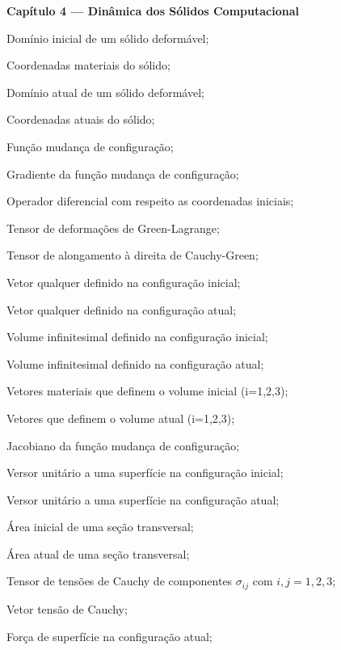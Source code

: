 \begin{simbolos}
  \vspace{0.5cm}
  \item[]\textbf{Capítulo 4 — Dinâmica dos Sólidos Computacional}
  \item[$\Omega_{0}$] Domínio inicial de um sólido deformável;
  \item[$\lPosition$] Coordenadas materiais do sólido;
  \item[$\Omega$] Domínio atual de um sólido deformável;
  \item[$\ePosition$] Coordenadas atuais do sólido;
  \item[$\fmap$] Função mudança de configuração;
  \item[$\gradDeformation$] Gradiente da função mudança de configuração;
  \item[$\lGrad$] Operador diferencial com respeito as coordenadas iniciais;
  \item[$\greenStrain$] Tensor de deformações de Green-Lagrange;
  \item[$\cauchyStretch$] Tensor de alongamento à direita de Cauchy-Green;
  \item[$\mathbf{u}$] Vetor qualquer definido na configuração inicial;
  \item[$\mathbf{v}$] Vetor qualquer definido na configuração atual;
  \item[$dV_{0}$] Volume infinitesimal definido na configuração inicial;
  \item[$dV$] Volume infinitesimal definido na configuração atual;
  \item[$\mathbf{dx}_{i}$] Vetores materiais que definem o volume inicial (i=1,2,3);
  \item[$\mathbf{dy}_{i}$] Vetores que definem o volume atual (i=1,2,3);
  \item[$J$] Jacobiano da função mudança de configuração;
  \item[$\mathbf{N}$] Versor unitário a uma superfície na configuração inicial;
  \item[$\mathbf{n}$] Versor unitário a uma superfície na configuração atual;
  \item[$dA_0$] Área inicial de uma seção transversal;
  \item[$dA$] Área atual de uma seção transversal;
  \item[$\stressTensor$] Tensor de tensões de Cauchy de componentes $\sigma_{ij}$ com $i,j = 1,2,3$;
  \item[$\mathbf{t}$] Vetor tensão de Cauchy;
  \item[$\tractionLoad$] Força de superfície na configuração atual;

\end{simbolos}
